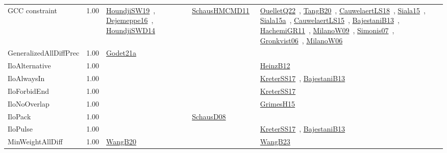 {\begin{longtable}{p{3cm}r>{\raggedright\arraybackslash}p{6cm}>{\raggedright\arraybackslash}p{6cm}>{\raggedright\arraybackslash}p{8cm}}
\index{GCC constraint}\index{Constraints!GCC constraint}GCC constraint &  1.00 & \href{../works/HoundjiSW19.pdf}{HoundjiSW19}~\cite{HoundjiSW19}, \href{../works/Dejemeppe16.pdf}{Dejemeppe16}~\cite{Dejemeppe16}, \href{../works/HoundjiSWD14.pdf}{HoundjiSWD14}~\cite{HoundjiSWD14} & \href{../works/SchausHMCMD11.pdf}{SchausHMCMD11}~\cite{SchausHMCMD11} & \href{../works/OuelletQ22.pdf}{OuelletQ22}~\cite{OuelletQ22}, \href{../works/TangB20.pdf}{TangB20}~\cite{TangB20}, \href{../works/CauwelaertLS18.pdf}{CauwelaertLS18}~\cite{CauwelaertLS18}, \href{../works/Siala15.pdf}{Siala15}~\cite{Siala15}, \href{../works/Siala15a.pdf}{Siala15a}~\cite{Siala15a}, \href{../works/CauwelaertLS15.pdf}{CauwelaertLS15}~\cite{CauwelaertLS15}, \href{../works/BajestaniB13.pdf}{BajestaniB13}~\cite{BajestaniB13}, \href{../works/HachemiGR11.pdf}{HachemiGR11}~\cite{HachemiGR11}, \href{../works/MilanoW09.pdf}{MilanoW09}~\cite{MilanoW09}, \href{../works/Simonis07.pdf}{Simonis07}~\cite{Simonis07}, \href{../works/Gronkvist06.pdf}{Gronkvist06}~\cite{Gronkvist06}, \href{../works/MilanoW06.pdf}{MilanoW06}~\cite{MilanoW06}\\
\index{GeneralizedAllDiffPrec}\index{Constraints!GeneralizedAllDiffPrec}GeneralizedAllDiffPrec &  1.00 & \href{../works/Godet21a.pdf}{Godet21a}~\cite{Godet21a} &  & \\
\index{IloAlternative}\index{Constraints!IloAlternative}IloAlternative &  1.00 &  &  & \href{../works/HeinzB12.pdf}{HeinzB12}~\cite{HeinzB12}\\
\index{IloAlwaysIn}\index{Constraints!IloAlwaysIn}IloAlwaysIn &  1.00 &  &  & \href{../works/KreterSS17.pdf}{KreterSS17}~\cite{KreterSS17}, \href{../works/BajestaniB13.pdf}{BajestaniB13}~\cite{BajestaniB13}\\
\index{IloForbidEnd}\index{Constraints!IloForbidEnd}IloForbidEnd &  1.00 &  &  & \href{../works/KreterSS17.pdf}{KreterSS17}~\cite{KreterSS17}\\
\index{IloNoOverlap}\index{Constraints!IloNoOverlap}IloNoOverlap &  1.00 &  &  & \href{../works/GrimesH15.pdf}{GrimesH15}~\cite{GrimesH15}\\
\index{IloPack}\index{Constraints!IloPack}IloPack &  1.00 &  & \href{../works/SchausD08.pdf}{SchausD08}~\cite{SchausD08} & \\
\index{IloPulse}\index{Constraints!IloPulse}IloPulse &  1.00 &  &  & \href{../works/KreterSS17.pdf}{KreterSS17}~\cite{KreterSS17}, \href{../works/BajestaniB13.pdf}{BajestaniB13}~\cite{BajestaniB13}\\
\index{MinWeightAllDiff}\index{Constraints!MinWeightAllDiff}MinWeightAllDiff &  1.00 & \href{../works/WangB20.pdf}{WangB20}~\cite{WangB20} &  & \href{../works/WangB23.pdf}{WangB23}~\cite{WangB23}\\

\end{longtable}}
